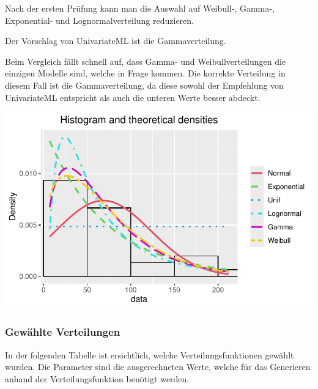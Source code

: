 \documentclass[
  letterpaper,
  DIV=11,
  numbers=noendperiod]{scrartcl}
\begin{document}
Nach der ersten Prüfung kann man die Auswahl auf Weibull-, Gamma-,
Exponential- und Lognormalverteilung reduzieren.

Der Vorschlag von UnivariateML ist die Gammaverteilung.

Beim Vergleich fällt schnell auf, dass Gamma- und Weibullverteilungen
die einzigen Modelle sind, welche in Frage kommen. Die korrekte
Verteilung in diesem Fall ist die Gammaverteilung, da diese sowohl der
Empfehlung von UnivariateML entspricht als auch die unteren Werte besser
abdeckt.

\includegraphics{steinschlag_bericht_files/figure-pdf/unnamed-chunk-15-1.pdf}

\newpage

\subsubsection{Gewählte Verteilungen}\label{gewuxe4hlte-verteilungen}

In der folgenden Tabelle ist ersichtlich, welche Verteilungsfunktionen
gewählt wurden. Die Parameter sind die ausgerechneten Werte, welche für
das Generieren anhand der Verteilungsfunktion benötigt werden.
\end{document}
